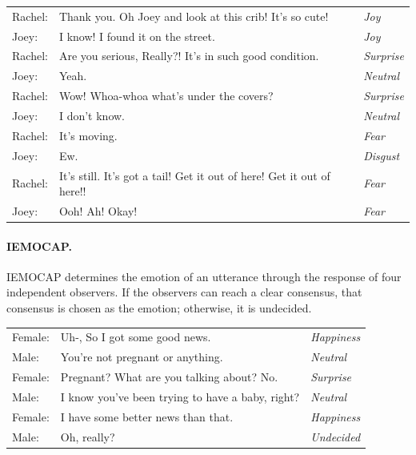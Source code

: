 \documentclass[nofilelist]{cslthse-msc}
\begin{document}
\begin{table}[H]
    \begin{pag}

    \centering
    \begin{tabular}{lll}
Rachel: & Thank you. Oh Joey and look at this crib! It's so cute! & \textit{Joy} \\
Joey: & I know! I found it on the street. & \textit{Joy} \\
Rachel: & Are you serious, Really?! It's in such good condition. & \textit{Surprise} \\
Joey: & Yeah. & \textit{Neutral} \\
Rachel: & Wow! Whoa-whoa what's under the covers? & \textit{Surprise} \\
Joey: & I don't know. & \textit{Neutral} \\
Rachel: & It's moving. & \textit{Fear} \\
Joey: & Ew. & \textit{Disgust} \\
Rachel: & It's still. It's got a tail! Get it out of here! Get it out of here!! & \textit{Fear} \\
Joey: & Ooh! Ah! Okay! & \textit{Fear} \\
    \end{tabular}
    \label{tab:dialogue_meld}
\end{pag}
\end{table}

\paragraph{IEMOCAP.}
IEMOCAP determines the emotion of an utterance through the response of four independent observers. If the observers can reach a clear consensus, that consensus is chosen as the emotion; otherwise, it is undecided.  

\begin{table}[H]
    \begin{pag}

    \centering
    \begin{tabular}{lll}
Female: & Uh-, So I got some good news. & \textit{Happiness} \\
Male: & You're not pregnant or anything. & \textit{Neutral} \\
Female: & Pregnant? What are you talking about? No. & \textit{Surprise} \\
Male: & I know you've been trying to have a baby, right? & \textit{Neutral} \\
Female: & I have some better news than that. & \textit{Happiness} \\
Male: & Oh, really? & \textit{Undecided} \\
    \end{tabular}
    \label{tab:dialogue_iemocap}
\end{pag}
\end{table}
\end{document}

